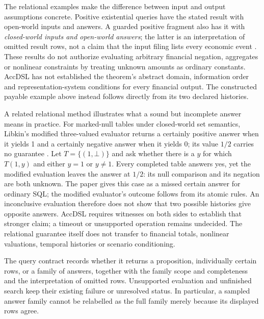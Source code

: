 The relational examples make the difference between input and output
assumptions concrete. Positive existential queries have the stated result
with open-world inputs and answers. A guarded positive fragment also has it
with \emph{closed-world inputs and open-world answers}; the latter is an
interpretation of omitted result rows, not a claim that the input filing
lists every economic event
\citep[Proposition~9 and Corollary~3, p.~20]{libkin2016certain}.
These results do not authorize evaluating arbitrary financial negation,
aggregates or nonlinear constraints by treating unknown amounts as ordinary
constants. AccDSL has not established the theorem's abstract domain,
information order and representation-system conditions for every financial
output. The constructed payable example above instead follows directly
from its two declared histories.

A related relational method illustrates what a sound but incomplete answer
means in practice. For marked-null tables under closed-world set semantics,
Libkin's modified three-valued evaluator returns a certainly positive answer
when it yields 1 and a certainly negative answer when it yields 0; its value
$1/2$ carries no guarantee \citep[Theorems~4.1 and~5.3, pp.~8--12]{libkin2016sql}.
Let $T=\{(1,\bot)\}$ and ask whether there is a $y$ for which $T(1,y)$ and
either $y=1$ or $y\ne 1$. Every completed table answers yes, yet the modified
evaluation leaves the answer at $1/2$: its null comparison and its negation
are both unknown. The paper gives this case as a missed certain answer for
ordinary SQL; the modified evaluator's outcome follows from its atomic rules.
An inconclusive evaluation therefore does not show that two possible histories
give opposite answers. AccDSL requires witnesses on both sides to establish
that stronger claim; a timeout or unsupported operation remains undecided.
The relational guarantee itself does not transfer to financial totals,
nonlinear valuations, temporal histories or scenario conditioning.

The query contract records whether it returns a proposition, individually
certain rows, or a family of answers, together with the family scope and
completeness and the interpretation of omitted rows. Unsupported evaluation
and unfinished search keep their existing failure or unresolved status. In
particular, a sampled answer family cannot be relabelled as the full family
merely because its displayed rows agree.

